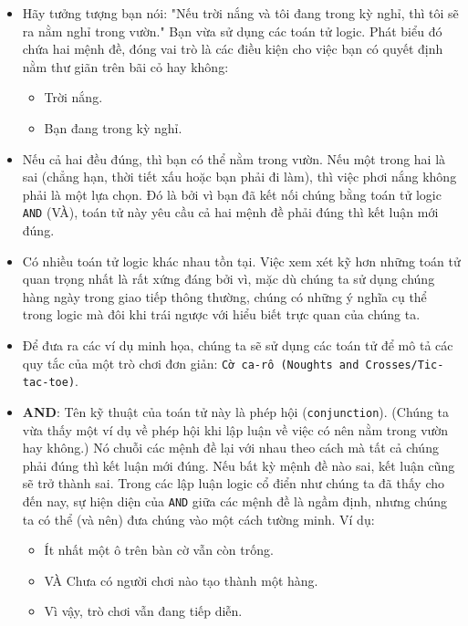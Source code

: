 \begin{itemize}
    \item Hãy tưởng tượng bạn nói: "Nếu trời nắng và tôi đang trong kỳ nghỉ, thì tôi sẽ ra nằm nghỉ trong vườn." Bạn vừa sử dụng các toán tử logic. Phát biểu đó chứa hai mệnh đề, đóng vai trò là các điều kiện cho việc bạn có quyết định nằm thư giãn trên bãi cỏ hay không:
    \begin{itemize}
        \item Trời nắng.
        \item Bạn đang trong kỳ nghỉ.
    \end{itemize}

    \item Nếu cả hai đều đúng, thì bạn có thể nằm trong vườn. Nếu một trong hai là sai (chẳng hạn, thời tiết xấu hoặc bạn phải đi làm), thì việc phơi nắng không phải là một lựa chọn. Đó là bởi vì bạn đã kết nối chúng bằng toán tử logic \texttt{AND} (VÀ), toán tử này yêu cầu cả hai mệnh đề phải đúng thì kết luận mới đúng.

    \item Có nhiều toán tử logic khác nhau tồn tại. Việc xem xét kỹ hơn những toán tử quan trọng nhất là rất xứng đáng bởi vì, mặc dù chúng ta sử dụng chúng hàng ngày trong giao tiếp thông thường, chúng có những ý nghĩa cụ thể trong logic mà đôi khi trái ngược với hiểu biết trực quan của chúng ta.

    \item Để đưa ra các ví dụ minh họa, chúng ta sẽ sử dụng các toán tử để mô tả các quy tắc của một trò chơi đơn giản: \texttt{Cờ ca-rô (Noughts and Crosses/Tic-tac-toe)}.

    \item \textbf{AND}: Tên kỹ thuật của toán tử này là phép hội (\texttt{conjunction}). (Chúng ta vừa thấy một ví dụ về phép hội khi lập luận về việc có nên nằm trong vườn hay không.) Nó chuỗi các mệnh đề lại với nhau theo cách mà tất cả chúng phải đúng thì kết luận mới đúng. Nếu bất kỳ mệnh đề nào sai, kết luận cũng sẽ trở thành sai. Trong các lập luận logic cổ điển như chúng ta đã thấy cho đến nay, sự hiện diện của \texttt{AND} giữa các mệnh đề là ngầm định, nhưng chúng ta có thể (và nên) đưa chúng vào một cách tường minh. Ví dụ:
    \begin{itemize}
        \item Ít nhất một ô trên bàn cờ vẫn còn trống.
        \item VÀ Chưa có người chơi nào tạo thành một hàng.
        \item Vì vậy, trò chơi vẫn đang tiếp diễn.
    \end{itemize}
\end{itemize}

